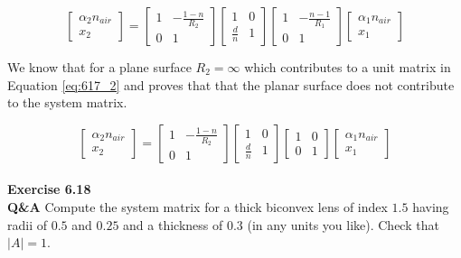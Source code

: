 \documentclass[main.tex]{subfiles}
\begin{document}
\begin{equation}\label{eq:617_1}
\begin{bmatrix}
    \alpha_2 n_{air}\\
    x_2
\end{bmatrix}
=
\begin{bmatrix}
    1   &   -\frac{1-n}{R_2} \\
    0   &   1
\end{bmatrix}
\begin{bmatrix}
    1   &   0 \\
    \frac{d}{n}   &   1
\end{bmatrix}
\begin{bmatrix}
    1   &   -\frac{n-1}{R_1} \\
    0   &   1
\end{bmatrix}
\begin{bmatrix}
    \alpha_{1}n_{air} \\
    x_1
\end{bmatrix}
\end{equation}

We know that for a plane surface $R_2 = \infty$ which contributes to a unit matrix in Equation \ref{eq:617_2} and proves that that the planar surface does not contribute to the system matrix. 

\begin{equation}\label{eq:617_2}
\begin{bmatrix}
    \alpha_2 n_{air}\\
    x_2
\end{bmatrix}
=
\begin{bmatrix}
    1   &   -\frac{1-n}{R_2} \\
    0   &   1
\end{bmatrix}
\begin{bmatrix}
    1   &   0 \\
    \frac{d}{n}   &   1
\end{bmatrix}
\begin{bmatrix}
    1   &   0 \\
    0   &   1
\end{bmatrix}
\begin{bmatrix}
    \alpha_{1}n_{air} \\
    x_1
\end{bmatrix}
\end{equation}\\

\textbf{Exercise 6.18}\\ %
\textbf{Q\&A} Compute the system matrix for a thick biconvex lens of index $1.5$ having radii of $0.5$ and $0.25$ and a thickness of $0.3$ (in any units you like). Check that $|A| = 1$.\\
\end{document}
